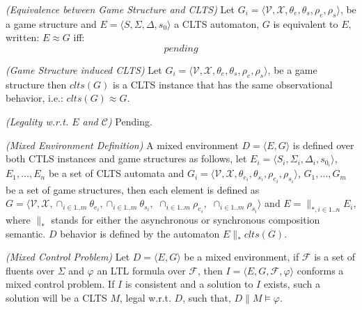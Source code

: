 \begin{definition}
	\label{def:gs_clts_equivalence} \emph{(Equivalence between Game Structure and CLTS)} 
	Let $G_i=\langle \mathcal{V}, \mathcal{X}, \theta_{e}, \theta_{s}, \rho_{e}, \rho_{s}\rangle$, be a game structure and $E=\langle S, \Sigma, \Delta, s_{0}\rangle$ a CLTS automaton, $G$ is equivalent to $E$, written: $E \approx G$ iff:
	\[pending\] 
\end{definition}

\begin{definition}
	\label{def:gs_conversion} \emph{(Game Structure induced CLTS)} 
	Let $G_i=\langle \mathcal{V}, \mathcal{X}, \theta_{e}, \theta_{s}, \rho_{e}, \rho_{s}\rangle$, be a game structure then $clts(G)$ is a CLTS instance that has the same observational behavior, i.e.: $clts(G) \approx G$. 
\end{definition}

\begin{definition}
	\label{def:legal_clts} \emph{(Legality w.r.t. $E$ and $\mathcal{C}$)} 
	Pending.
\end{definition}

\begin{definition}
	\label{def:mixed_env} \emph{(Mixed Environment Definition)} 
	A mixed environment $D = \langle E, G \rangle$ is defined over both CTLS instances and game structures as follows,
	let $E_i=\langle S_i, \Sigma_i, \Delta_i, s_{0_i}\rangle$, $E_1,\ldots,E_n$ be a set of CLTS automata and $G_i=\langle \mathcal{V}, \mathcal{X}, \theta_{e_i}, \theta_{s_i}, \rho_{e_i}, \rho_{s_i}\rangle$, $G_1,\ldots,G_m$ be a set of game structures,
	then each element is defined as $G=\langle \mathcal{V}, \mathcal{X}, \cap_{i \in 1..m}\theta_{e_i}, \cap_{i \in 1..m}\theta_{s_i},$ $\cap_{i \in 1..m}\rho_{e_i},$ $\cap_{i \in 1..m}\rho_{s_i}\rangle$ and $E = \parallel_{*,i \in 1..n} E_i$, where $\parallel_*$ stands for either the asynchronous or synchronous composition semantic.
	$D$ behavior is defined by the automaton $E \parallel_* clts(G)$.
\end{definition}

\begin{definition}
	\label{def:mixed_control_problem} \emph{(Mixed Control Problem)} 
	Let $D= \langle E, G \rangle$ be a mixed environment, if $\mathcal{F}$ is a set of fluents over $\Sigma$ and $\varphi$ an LTL formula over $\mathcal{F}$, then $I = \langle E, G, \mathcal{F}, \varphi \rangle$ conforms a mixed control problem. If $I$ is consistent and a solution to $I$ exists, such a solution will be a CLTS $M$, legal w.r.t. $D$, such that, $D \parallel M \models \varphi$.
\end{definition}

